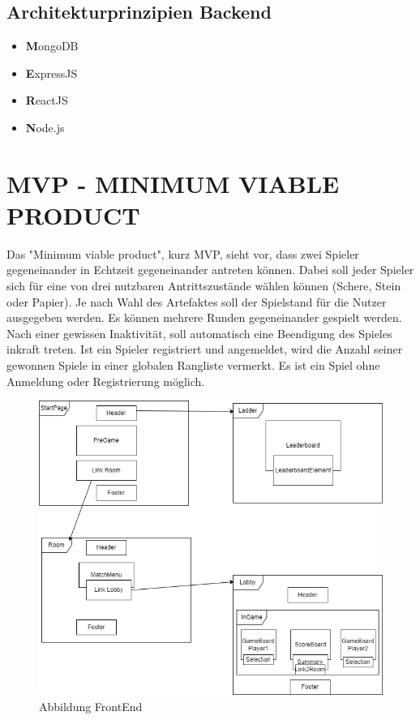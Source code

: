 \documentclass[conference]{IEEEtran}
\begin{document}
\begin{itemize}
\subsection{Architekturprinzipien Backend}

\begin{itemize}
    \item \textbf {M}ongoDB
    \item \textbf {E}xpressJS
    \item \textbf {R}eactJS
    \item \textbf {N}ode.js
\end{itemize}



\section{MVP - MINIMUM VIABLE PRODUCT}
Das "Minimum viable product", kurz MVP, sieht vor, dass zwei Spieler gegeneinander in Echtzeit gegeneinander antreten können. Dabei soll jeder Spieler sich für eine von drei nutzbaren Antrittszustände wählen können (Schere, Stein oder Papier). Je nach Wahl des Artefaktes soll der Spielstand für die Nutzer ausgegeben werden. Es können mehrere Runden gegeneinander gespielt werden.
Nach einer gewissen Inaktivität, soll automatisch eine Beendigung des Spieles inkraft treten.
Ist ein Spieler registriert und angemeldet, wird die Anzahl seiner gewonnen Spiele in einer globalen Rangliste vermerkt. Es ist ein Spiel ohne Anmeldung oder Registrierung möglich.

\begin{figure}[htbp]
\centering
\includegraphics[scale=0.35]{FrontEndApplication.png}
\caption{Abbildung FrontEnd}%
\end{figure}
\begin{itemize}


\end{itemize}
\end{itemize}
\end{document}
